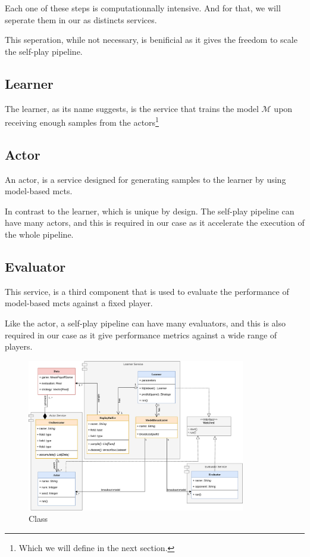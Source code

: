 Each one of these steps is computationnally intensive. And for that, we will seperate them in our as distincts services.

This seperation, while not necessary, is benificial as it gives the freedom to scale the self-play pipeline.
\subsection{Learner}
The learner, as its name suggests, is the service that trains the model $\mathcal{M}$ upon receiving enough samples from the actors\footnote{Which we will define in the next section.}

\subsection{Actor}
An actor, is a service designed for generating samples to the learner by using model-based \acrshort{mcts}.

In contrast to the learner, which is unique by design. The self-play pipeline can have many actors, and this is required in our case as it accelerate the execution of the whole pipeline.

\subsection{Evaluator}
This service, is a third component that is used to evaluate the performance of model-based \acrshort{mcts} against a fixed player.

Like the actor, a self-play pipeline can have many evaluators, and this is also required in our case as it give performance metrics against a wide range of players.

\begin{figure}[H]
	\centering
	\includegraphics[width=0.85\textwidth]{Figures/ServiceRelations.png}
	\caption{Class }
\end{figure}
\FloatBarrier


